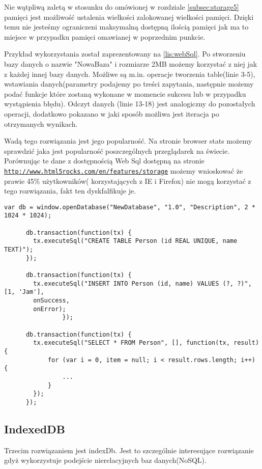 Nie wątpliwą zaletą w stosunku do omówionej w rozdziale \ref{subsec:storage5} pamięci jest możliwość ustalenia wielkości zalokowanej wielkości pamięci. Dzięki temu nie jesteśmy ograniczeni maksymalną dostępną ilością pamięci jak ma to miejsce w przypadku pamięci omawianej w poprzednim punkcie.

Przykład wykorzystania został zaprezentowany na \ref{lis:webSql}. Po stworzeniu bazy danych o nazwie "NowaBaza" i rozmiarze 2MB możemy korzystać z niej jak z każdej innej bazy danych. Możliwe są m.in. operacje tworzenia table(linie 3-5), wstawiania danych(parametry podajemy po treści zapytania, następnie możemy podać funkcje które zostaną wykonane w momencie sukcesu lub w przypadku wystąpienia błędu). Odczyt danych (linie 13-18) jest analogiczny do pozostałych operacji, dodatkowo pokazano w jaki sposób możliwa jest iteracja po otrzymanych wynikach.

Wadą tego rozwiązania jest jego popularność. Na stronie browser stats  możemy sprawdzić jaka jest popularność poszczególnych przeglądarek na świecie. Porównując te dane z dostępnością Web Sql dostępną na stronie \underline{\texttt{http://www.html5rocks.com/en/features/storage}} możemy wnioskować że prawie 45\% użytkowników( korzystających z IE i Firefox) nie mogą korzystać z tego rozwiązania, fakt ten dyskfalfikuje je.

\lstset{language=JavaScript}
\label{lis:webSql}
\begin{lstlisting}[caption=json]
      var db = window.openDatabase("NewDatabase", "1.0", "Description", 2 * 1024 * 1024);

      db.transaction(function(tx) {
        tx.executeSql("CREATE TABLE Person (id REAL UNIQUE, name TEXT)");
      });

      db.transaction(function(tx) {
        tx.executeSql("INSERT INTO Person (id, name) VALUES (?, ?)", [1, 'Jam'],
        onSuccess,
        onError);
                });

      db.transaction(function(tx) {
        tx.executeSql("SELECT * FROM Person", [], function(tx, result) {
            for (var i = 0, item = null; i < result.rows.length; i++) {
                ...
			}
        });
      });
\end{lstlisting}

\subsection{IndexedDB}
\label{subsec:indexDB}

Trzecim rozwiązaniem jest indexDb. Jest to szczególnie interesujące rozwiązanie gdyż wykorzystuje podejście nierelacyjnych baz danych(NoSQL).

